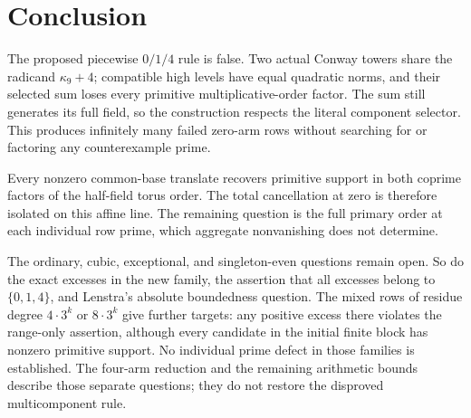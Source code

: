 \documentclass[11pt]{article}
\theoremstyle{definition}
\theoremstyle{remark}
\begin{document}
\section{Conclusion}

The proposed piecewise $0/1/4$ rule is false.  Two actual Conway towers share
the radicand $\kappa_9+4$; compatible high levels have equal quadratic norms,
and their selected sum loses every primitive multiplicative-order factor.
The sum still generates its full field, so the construction respects the
literal component selector.  This produces infinitely many failed zero-arm
rows without searching for or factoring any counterexample prime.

Every nonzero common-base translate recovers primitive support in both
coprime factors of the half-field torus order.  The total cancellation at
zero is therefore isolated on this affine line.  The remaining question is
the full primary order at each individual row prime, which aggregate
nonvanishing does not determine.

The ordinary, cubic, exceptional, and singleton-even questions remain open.
So do the exact excesses in the new family, the assertion that all excesses
belong to $\{0,1,4\}$, and Lenstra's absolute boundedness question.  The
mixed rows of residue degree $4\cdot3^k$ or $8\cdot3^k$ give further
targets: any positive excess there violates the range-only assertion,
although every candidate in the initial finite block has nonzero primitive
support. No individual prime defect in those families is established.
The
four-arm reduction and the remaining arithmetic bounds describe those
separate questions; they do not restore the disproved multicomponent rule.



\end{document}
